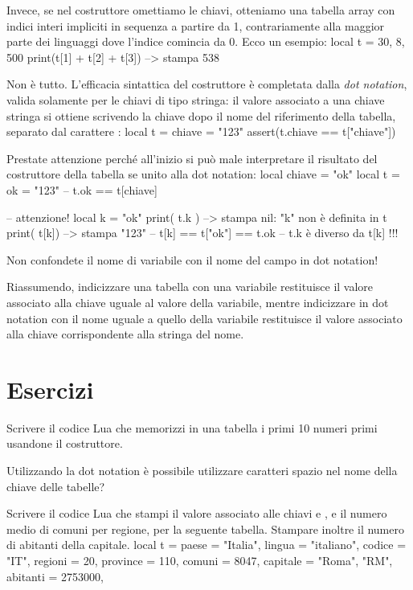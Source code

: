 Invece, se nel costruttore omettiamo le chiavi, otteniamo una tabella array con
indici interi impliciti in sequenza a partire da 1, contrariamente alla maggior
parte dei linguaggi dove l'indice comincia da 0. Ecco un esempio:
\lines
local t = { 30, 8, 500 }
print(t[1] + t[2] + t[3]) --> stampa 538
\endlines
{}

Non è tutto. L'efficacia sintattica del costruttore è completata dalla
\emph{dot notation}, valida solamente per le chiavi di tipo stringa:
il valore associato a una chiave stringa si ottiene scrivendo la chiave dopo
il nome del riferimento della tabella, separato dal carattere :
\lines
local t = { chiave = "123" }
assert(t.chiave == t["chiave"])
\endlines
{}

Prestate attenzione perché all'inizio si può male interpretare il risultato del
costruttore della tabella se unito alla dot notation:
\lines
local chiave = "ok"
local t = { ok = "123"} -- t.ok == t[chiave]

-- attenzione!
local k = "ok"
print( t.k ) --> stampa nil: "k" non è definita in t
print( t[k]) --> stampa "123"
-- t[k] == t["ok"] == t.ok
-- t.k è diverso da t[k] !!!
\endlines
{}

Non confondete il nome di variabile con il nome del campo in dot notation!

Riassumendo, indicizzare una tabella con una variabile restituisce il valore
associato alla chiave uguale al valore della variabile, mentre indicizzare in
dot notation con il nome uguale a quello della variabile restituisce il valore
associato alla chiave corrispondente alla stringa del nome.


\section{Esercizi}

\begin{Exercise}[label={tab-01}]
Scrivere il codice Lua che memorizzi in una tabella i primi 10 numeri primi
usandone il costruttore.
\end{Exercise}

\begin{Exercise}[label={tab-02}]
Utilizzando la dot notation è possibile utilizzare caratteri spazio nel nome
della chiave delle tabelle?
\end{Exercise}

\begin{Exercise}[label={tab-03}]
Scrivere il codice Lua che stampi il valore associato alle chiavi  e
, e il numero medio di comuni per regione, per la seguente tabella.
Stampare inoltre il numero di abitanti della capitale.
\lines
local t = {
    paese = "Italia",
    lingua = "italiano",
    codice = "IT",
    regioni = 20,
    province = 110,
    comuni = 8047,
    capitale = {"Roma", "RM", abitanti = 2753000},
}
\endlines
{}
\end{Exercise}

